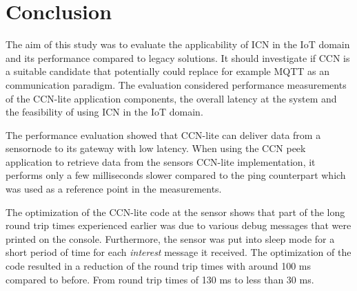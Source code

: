 \section{Conclusion}

%
%

The aim of this study was to evaluate the applicability of ICN in the IoT domain and its performance compared to legacy solutions. It should investigate if CCN is a suitable candidate that potentially could replace for example MQTT as an communication paradigm.
The evaluation considered performance measurements of the CCN-lite application components, the overall latency at the system and the feasibility of using ICN in the IoT domain.

The performance evaluation showed that CCN-lite can deliver data from a sensornode to its gateway with low latency. When using the CCN peek application to retrieve data from the sensors CCN-lite implementation, it performs only a few milliseconds slower compared to the ping counterpart which was used as a reference point in the measurements.

The optimization of the CCN-lite code at the sensor shows that part of the long round trip times experienced earlier was due to various debug messages that were printed on the console. Furthermore, the sensor was put into sleep mode for a short period of time for each \textit{interest} message it received. The optimization of the code resulted in a reduction of the round trip times with around 100 ms compared to before. From round trip times of 130 ms to less than 30 ms.

